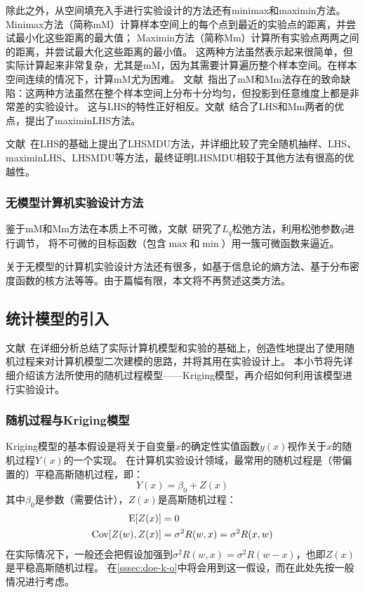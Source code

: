 \documentclass[index]{subfiles}
\begin{document}
除此之外，从空间填充入手进行实验设计的方法还有minimax和maximin方法\cite{johnson1990}。
Minimax方法（简称mM）计算样本空间上的每个点到最近的实验点的距离，并尝试最小化这些距离的最大值；
Maximin方法（简称Mm）计算所有实验点两两之间的距离，并尝试最大化这些距离的最小值。
这两种方法虽然表示起来很简单，但实际计算起来非常复杂，尤其是mM，因为其需要计算遍历整个样本空间。在样本空间连续的情况下，计算mM尤为困难。
文献~指出了mM和Mm法存在的致命缺陷：这两种方法虽然在整个样本空间上分布十分均匀，但投影到任意维度上都是非常差的实验设计。
这与LHS的特性正好相反。文献~结合了LHS和Mm两者的优点，提出了maximinLHS方法。

文献~在LHS的基础上提出了LHSMDU方法，并详细比较了完全随机抽样、LHS、maximinLHS、LHSMDU等方法，最终证明LHSMDU相较于其他方法有很高的优越性。

\subsubsection{无模型计算机实验设计方法}
鉴于mM和Mm方法在本质上不可微，文献~研究了$L_q$松弛方法，利用松弛参数$q$进行调节，
将不可微的目标函数（包含$\max$和$\min$）用一簇可微函数来逼近。

关于无模型的计算机实验设计方法还有很多，如基于信息论的熵方法、基于分布密度函数的核方法等等\cite{pronzato2012}。由于篇幅有限，本文将不再赘述这类方法。

\subsection{统计模型的引入}\label{ssec:doe-gp}
文献~在详细分析总结了实际计算机模型和实验的基础上，创造性地提出了使用随机过程来对计算机模型二次建模的思路，并将其用在实验设计上。
本小节将先详细介绍该方法所使用的随机过程模型——Kriging模型，再介绍如何利用该模型进行实验设计。

\subsubsection{随机过程与Kriging模型}\label{sssec:doe-kriging}
Kriging模型的基本假设是将关于自变量$x$的确定性实值函数$y(x)$视作关于$x$的随机过程$Y(x)$的一个实现。
在计算机实验设计领域，最常用的随机过程是（带偏置的）平稳高斯随机过程，即：
\begin{equation}\label{equ:doe-kriging}
  Y(x) = \beta_0 + Z(x)
\end{equation}
其中$\beta_0$是参数（需要估计），$Z(x)$是高斯随机过程：
\begin{align}\label{equ:doe-stationary}
  \operatorname{E}\!\left[Z(x)\right] &= 0 \\
  \operatorname{Cov}\!\left[Z(w),Z(x)\right] &= \sigma^2 R(w, x) = \sigma^2 R(x, w)
\end{align}
在实际情况下，一般还会把假设加强到$\sigma^2 R(w, x) = \sigma^2 R(w - x)$，也即$Z(x)$是平稳高斯随机过程。
在\cref{sssec:doe-k-o}中将会用到这一假设，而在此处先按一般情况进行考虑。
\end{document}
